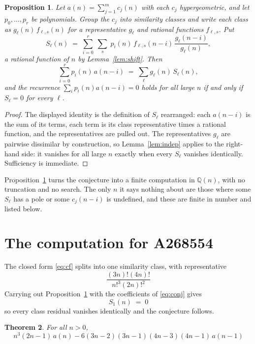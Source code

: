 \documentclass[11pt,a4paper]{article}
\theoremstyle{plain}
\newtheorem{theorem}{Theorem}
\newtheorem{proposition}[theorem]{Proposition}
\theoremstyle{definition}
\begin{document}
\begin{proposition}\label{prop:main}
Let $a(n)=\sum_{j=1}^{m}c_{j}(n)$ with each $c_{j}$ hypergeometric, and let
$p_{0},\dots,p_{r}$ be polynomials. Group the $c_{j}$ into similarity classes and write
each class as $g_{\ell}(n)\,f_{\ell,s}(n)$ for a representative $g_{\ell}$ and rational
functions $f_{\ell,s}$. Put
\[
S_{\ell}(n)\;=\;\sum_{i=0}^{r}\;\sum_{s}\;p_{i}(n)\,f_{\ell,s}(n-i)\,
\frac{g_{\ell}(n-i)}{g_{\ell}(n)} ,
\]
a rational function of $n$ by Lemma~\ref{lem:shift}. Then
\[
\sum_{i=0}^{r}p_{i}(n)\,a(n-i)\;=\;\sum_{\ell}g_{\ell}(n)\,S_{\ell}(n),
\]
and the recurrence $\sum_{i}p_{i}(n)a(n-i)=0$ holds for all large $n$ if and only if
$S_{\ell}=0$ for every $\ell$.
\end{proposition}

\begin{proof}
The displayed identity is the definition of $S_{\ell}$ rearranged: each $a(n-i)$ is the
sum of its terms, each term is its class representative times a rational function, and the
representatives are pulled out. The representatives $g_{\ell}$ are pairwise dissimilar by
construction, so Lemma~\ref{lem:indep} applies to the right-hand side: it vanishes for all
large $n$ exactly when every $S_{\ell}$ vanishes identically. Sufficiency is immediate.
\end{proof}

Proposition~\ref{prop:main} turns the conjecture into a finite computation in
$\mathbb{Q}(n)$, with no truncation and no search. The only $n$ it says nothing about are
those where some $S_{\ell}$ has a pole or some $c_{j}(n-i)$ is undefined, and these are
finite in number and listed below.

\section{The computation for A268554}

The closed form \eqref{eq:cf} splits into one similarity class, with
representative
\[
\frac{\left(3 n\right)! \left(4 n\right)!}{n!^{3} \left(2 n\right)!^{2}}
\]
Carrying out Proposition~\ref{prop:main} with the coefficients of \eqref{eq:conj} gives
\[
S_{1}(n)\;=\;0
\]
so every class residual vanishes identically and the conjecture follows.

\begin{theorem}
For all $n> 0$,
\[
n^{3} \left(2 n - 1\right)\,a(n) -  6 \left(3 n - 2\right) \left(3 n - 1\right) \left(4 n - 3\right) \left(4 n - 1\right)\,a(n-1)
\]
\end{theorem}
\end{document}
